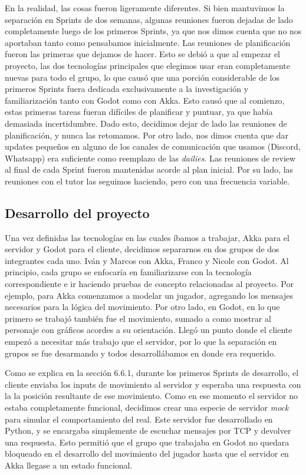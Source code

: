 En la realidad, las cosas fueron ligeramente diferentes. Si bien mantuvimos la separación en Sprints de dos semanas, algunas reuniones
fueron dejadas de lado completamente luego de los primeros Sprints, ya que nos dimos cuenta que no nos aportaban tanto como pensabamos
inicialmente.
Las reuniones de planificación fueron las primeras que dejamos de hacer. Esto se debió a que al empezar el proyecto, las 
dos tecnologías principales que elegimos usar eran completamente nuevas para todo el grupo, lo que causó que una porción considerable de
los primeros Sprints fuera dedicada exclusivamente a la investigación y familiarización tanto con Godot como con Akka. Esto causó que al
comienzo, estas primeras tareas fueran difíciles de planificar y puntuar, ya que había demasiada incertidumbre. Dado esto, decidimos dejar
de lado las reuniones de planificación, y nunca las retomamos.
Por otro lado, nos dimos cuenta que dar updates pequeños en alguno de los canales de comunicación que usamos (Discord, Whatsapp) era suficiente
como reemplazo de las \textit{dailies}.
Las reuniones de review al final de cada Sprint fueron mantenidas acorde al plan inicial.
Por su lado, las reuniones con el tutor las seguimos haciendo, pero con una frecuencia variable.

\subsection{Desarrollo del proyecto}

\noindent Una vez definidas las tecnologías en las cuales íbamos a trabajar, Akka para el servidor y Godot para el cliente, decidimos separarnos
en dos grupos de dos integrantes cada uno. Iván y Marcos con Akka, Franco y Nicole con Godot. Al principio, cada grupo se enfocaría en 
familiarizarse con la tecnología correspondiente e ir haciendo pruebas de concepto relacionadas al proyecto. Por ejemplo, para Akka 
comenzamos a modelar un jugador, agregando los mensajes necesarios para la lógica del movimiento. Por otro lado, en Godot, en lo que primero
se trabajó también fue el movimiento, sumado a como mostrar al personaje con gráficos acordes a su orientación.
Llegó un punto donde el cliente empezó a necesitar más trabajo que el servidor, por lo que la separación en grupos se fue desarmando y
todos desarrollábamos en donde era requerido.

Como se explica en la sección 6.6.1, durante los primeros Sprints de desarrollo, el cliente enviaba los inputs de movimiento al servidor y esperaba una respuesta con la
la posición resultante de ese movimiento. Como en ese momento el servidor no estaba completamente funcional, decidimos crear una especie de servidor
\textit{mock} para simular el comportamiento del real. Este servidor fue desarrollado en Python, y se encargaba simplemente de escuchar mensajes por TCP
y devolver una respuesta. Esto permitió que el grupo que trabajaba en Godot no quedara bloqueado en el desarrollo del movimiento del jugador
hasta que el servidor en Akka llegase a un estado funcional.

